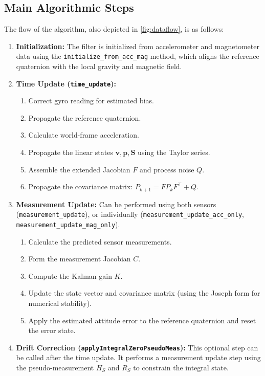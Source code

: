 \documentclass[11pt]{article}
\begin{document}
\subsection{Main Algorithmic Steps}
The flow of the algorithm, also depicted in \cref{fig:dataflow}, is as follows:
\begin{enumerate}
    \item \textbf{Initialization:} The filter is initialized from accelerometer and magnetometer data using the \texttt{initialize\_from\_acc\_mag} method, which aligns the reference quaternion with the local gravity and magnetic field.
    \item \textbf{Time Update (\texttt{time\_update}):}
    \begin{enumerate}
        \item Correct gyro reading for estimated bias.
        \item Propagate the reference quaternion.
        \item Calculate world-frame acceleration.
        \item Propagate the linear states $\bm{v}, \bm{p}, \bm{S}$ using the Taylor series.
        \item Assemble the extended Jacobian $F$ and process noise $Q$.
        \item Propagate the covariance matrix: $P_{k+1} = F P_k F^\top + Q$.
    \end{enumerate}
    \item \textbf{Measurement Update:} Can be performed using both sensors (\texttt{measurement\_update}), or individually (\texttt{measurement\_update\_acc\_only}, \texttt{measurement\_update\_mag\_only}).
    \begin{enumerate}
        \item Calculate the predicted sensor measurements.
        \item Form the measurement Jacobian $C$.
        \item Compute the Kalman gain $K$.
        \item Update the state vector and covariance matrix (using the Joseph form for numerical stability).
        \item Apply the estimated attitude error to the reference quaternion and reset the error state.
    \end{enumerate}
    \item \textbf{Drift Correction (\texttt{applyIntegralZeroPseudoMeas}):} This optional step can be called after the time update. It performs a measurement update step using the pseudo-measurement $H_S$ and $R_S$ to constrain the integral state.
\end{enumerate}
\end{document}
